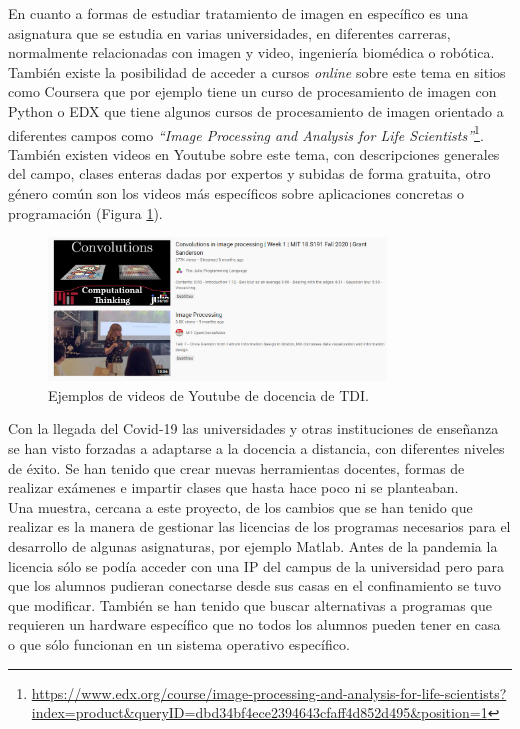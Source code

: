 En cuanto a formas de estudiar tratamiento de imagen en específico es una asignatura que se estudia en varias universidades, en diferentes carreras, normalmente relacionadas con imagen y video, ingeniería biomédica o robótica. También existe la posibilidad de acceder a cursos \emph{online} sobre este tema en sitios como Coursera que por ejemplo tiene un curso de procesamiento de imagen con Python o EDX que tiene algunos cursos de procesamiento de imagen orientado a diferentes campos como \emph{``Image Processing and Analysis for Life Scientists''}\footnote{\url{https://www.edx.org/course/image-processing-and-analysis-for-life-scientists?index=product&queryID=dbd34bf4ece2394643cfaff4d852d495&position=1}}. También existen videos en Youtube sobre este tema, con descripciones generales del campo, clases enteras dadas por expertos y subidas de forma gratuita, otro género común son los videos más específicos sobre aplicaciones concretas o programación (Figura \ref{youtube}).\\

\begin{figure}[h]
\centering
\includegraphics[width=0.8\textwidth]{imagenes/youtube.PNG}
\caption{Ejemplos de videos de Youtube de docencia de TDI.}
\label{youtube}
\end{figure}

Con la llegada del Covid-19 las universidades y otras instituciones de enseñanza se han visto forzadas a adaptarse a la docencia a distancia, con diferentes niveles de éxito. Se han tenido que crear nuevas herramientas docentes, formas de realizar exámenes e impartir clases que hasta hace poco ni se planteaban.\\

Una muestra,  cercana a este proyecto, de los cambios que se han tenido que realizar es la manera de gestionar las licencias de los programas necesarios para el desarrollo de algunas asignaturas, por ejemplo Matlab. Antes de la pandemia la licencia sólo se podía acceder con una IP del campus de la universidad pero para que los alumnos pudieran conectarse desde sus casas en el confinamiento se tuvo que modificar. También se han tenido que buscar alternativas a programas que requieren un hardware específico que no todos los alumnos pueden tener en casa o que sólo funcionan en un sistema operativo específico.\\

